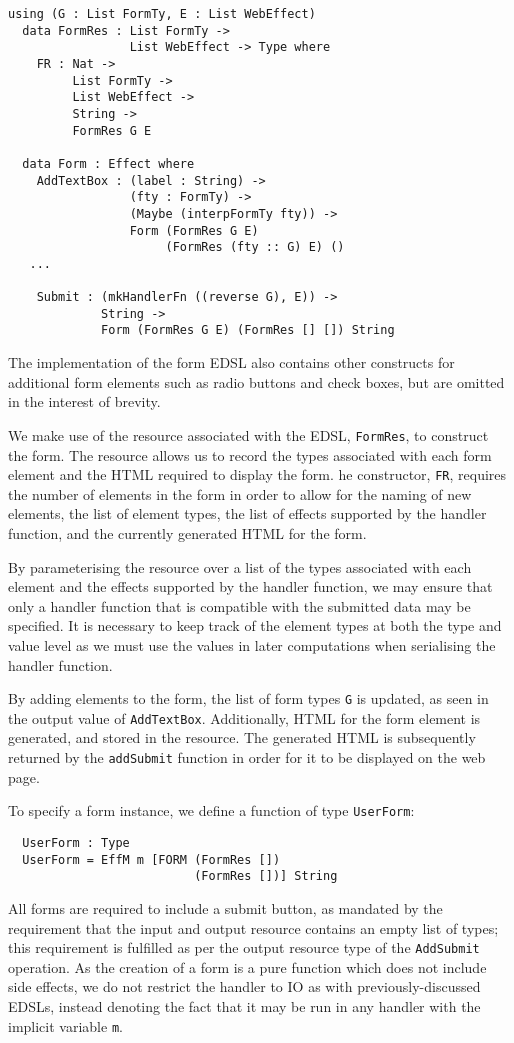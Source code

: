 \documentclass[preprint]{sigplanconf}
\begin{document}
\begin{Verbatim}
using (G : List FormTy, E : List WebEffect)
  data FormRes : List FormTy -> 
                 List WebEffect -> Type where
    FR : Nat -> 
         List FormTy -> 
         List WebEffect -> 
         String -> 
         FormRes G E
  
  data Form : Effect where
    AddTextBox : (label : String) -> 
                 (fty : FormTy) -> 
                 (Maybe (interpFormTy fty)) -> 
                 Form (FormRes G E) 
                      (FormRes (fty :: G) E) () 
   ...
   
    Submit : (mkHandlerFn ((reverse G), E)) ->
             String -> 
             Form (FormRes G E) (FormRes [] []) String
\end{Verbatim}
The implementation of the form EDSL also contains other constructs for additional form elements such as radio buttons and check boxes, but are omitted in the interest of brevity.

We make use of the resource associated with the EDSL, \texttt{FormRes}, to construct the form. The resource allows us to record the types associated with each form element and the HTML required to display the form. he constructor, \texttt{FR}, requires the number of elements in the form in order to allow for the naming of new elements, the list of element types, the list of effects supported by the handler function, and the currently generated HTML for the form. 

By parameterising the resource over a list of the types associated with each element and the effects supported by the handler function, we may ensure that only a handler function that is compatible with the submitted data may be specified. It is necessary to keep track of the element types at both the type and value level as we must use the values in later computations when serialising the handler function. 

By adding elements to the form, the list of form types \texttt{G} is updated, as seen in the output value of \texttt{AddTextBox}. Additionally, HTML for the form element is generated, and stored in the resource. The generated HTML is subsequently returned by the \texttt{addSubmit} function in order for it to be displayed on the web page.

To specify a form instance, we define a function of type \texttt{UserForm}:
\begin{Verbatim}
  UserForm : Type
  UserForm = EffM m [FORM (FormRes []) 
                          (FormRes [])] String
\end{Verbatim}
All forms are required to include a submit button, as mandated by the requirement that the input and output resource contains an empty list of types; this requirement is fulfilled as per the output resource type of the \texttt{AddSubmit} operation. As the creation of a form is a pure function which does not include side effects, we do not restrict the handler to IO as with previously-discussed EDSLs, instead denoting the fact that it may be run in any handler with the implicit variable \texttt{m}.
\end{document}
